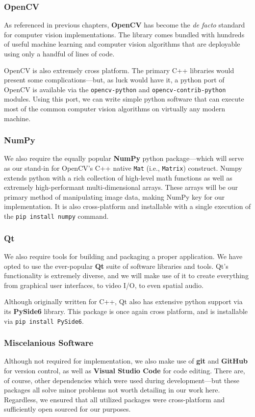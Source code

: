 \documentclass{report}
\newcommand{\tech}[1]{\textbf{#1}}
\begin{document}
\subsubsection{OpenCV}
As referenced in previous chapters, \tech{OpenCV} has become the \emph{de facto} standard for computer vision implementations. The library comes bundled with hundreds of useful machine learning and computer vision algorithms that are deployable using only a handful of lines of code.

OpenCV is also extremely cross platform. The primary C++ libraries would present some complications---but, as luck would have it, a python port of OpenCV is available via the \texttt{opencv-python} and \texttt{opencv-contrib-python} modules. Using this port, we can write simple python software that can execute most of the common computer vision algorithms on virtually any modern machine. 

\subsubsection{NumPy}
We also require the equally popular \tech{NumPy} python package---which will serve as our stand-in for OpenCV's C++ native \texttt{Mat} (i.e., \texttt{Matrix}) construct. Numpy extends python with a rich collection of high-level math functions as well as extremely high-performant multi-dimensional arrays. These arrays will be our primary method of manipulating image data, making NumPy key for our implementation. It is also cross-platform and installable with a single execution of the \texttt{pip install numpy} command.

\subsubsection{Qt}
We also require tools for building and packaging a proper application. We have opted to use the ever-popular \tech{Qt} suite of software libraries and tools. Qt's functionality is extremely diverse, and we will make use of it to create everything from graphical user interfaces, to video I/O, to even spatial audio.

Although originally written for C++, Qt also has extensive python support via its \tech{PySide6} library. This package is once again cross platform, and is installable via \texttt{pip install PySide6}.

\subsubsection{Miscelanious Software}
Although not required for implementation, we also make use of \tech{git} and \tech{GitHub} for version control, as well as \tech{Visual Studio Code} for code editing. There are, of course, other dependencies which were used during development---but these packages all solve minor problems not worth detailing in our work here. Regardless, we ensured that all utilized packages were cross-platform and sufficiently open sourced for our purposes. 
\end{document}
